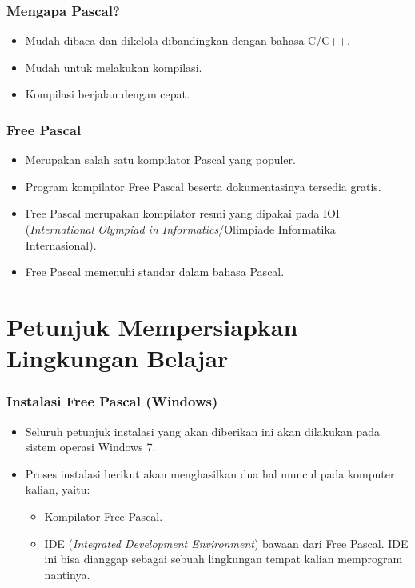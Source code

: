 \begin{frame}
\frametitle{Mengapa Pascal?}
\begin{itemize}
  \item Mudah dibaca dan dikelola dibandingkan dengan bahasa C/C++.
  \item Mudah untuk melakukan kompilasi.
  \item Kompilasi berjalan dengan cepat.
\end{itemize}
\end{frame}

\begin{frame}
\frametitle{Free Pascal}
\begin{itemize}
  \item Merupakan salah satu kompilator Pascal yang populer.
  \item Program kompilator Free Pascal beserta dokumentasinya tersedia gratis.
  \item Free Pascal merupakan kompilator resmi yang dipakai pada IOI (\textit{International Olympiad in Informatics}/Olimpiade Informatika Internasional).
  \item Free Pascal memenuhi standar dalam bahasa Pascal.
\end{itemize}
\end{frame}

\section{Petunjuk Mempersiapkan \newline Lingkungan Belajar}
\frame{\sectionpage}

\begin{frame}
\frametitle{Instalasi Free Pascal (Windows)}
\begin{itemize}
  \item Seluruh petunjuk instalasi yang akan diberikan ini akan dilakukan pada sistem operasi Windows 7.
  \item Proses instalasi berikut akan menghasilkan dua hal muncul pada komputer kalian, yaitu:
  \begin{itemize}
    \item Kompilator Free Pascal.
    \item IDE (\textit{Integrated Development Environment}) bawaan dari Free Pascal. IDE ini bisa dianggap sebagai sebuah lingkungan tempat kalian memprogram nantinya.
  \end{itemize}
\end{itemize}
\end{frame}


